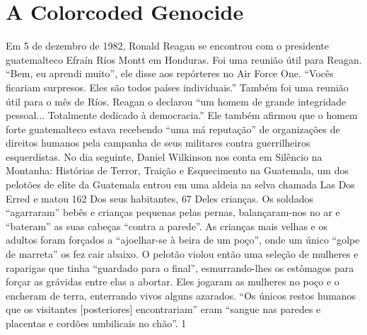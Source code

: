  
 \chapter{A Colorcoded Genocide}  

 \label{A Colorcoded Genocide}  
 
 
\par
 
 
 \textit{	}  

 
\par
 
 
 
\par
 

 \textbf{\textit{	} }  

 
\par
 
Em 5 de dezembro de 1982, Ronald Reagan se encontrou com o presidente guatemalteco Efraín Ríos Montt em Honduras. Foi uma reunião útil para Reagan. “Bem, eu aprendi muito”, ele disse aos repórteres no Air Force One. “Vocês ficariam surpresos. Eles são todos países individuais.” Também foi uma reunião útil para o mês de Ríos. Reagan o declarou “um homem de grande integridade pessoal... Totalmente dedicado à democracia.” Ele também afirmou que o homem forte guatemalteco estava recebendo “uma má reputação” de organizações de direitos humanos pela campanha de seus militares contra guerrilheiros esquerdistas. No dia seguinte, Daniel Wilkinson nos conta em Silêncio na Montanha: Histórias de Terror, Traição e Esquecimento na Guatemala, um dos pelotões de elite da Guatemala entrou em uma aldeia na selva chamada Las Dos Erred e matou
 {\color{blue} 162}  
Dos seus habitantes,
 {\color{blue} 67}  
Deles crianças. Os soldados “agarraram” bebês e crianças pequenas pelas pernas, balançaram-nos no ar e “bateram” as suas cabeças “contra a parede”. As crianças mais velhas e os adultos foram forçados a “ajoelhar-se à beira de um poço”, onde um único “golpe de marreta” os fez cair abaixo. O pelotão violou então uma seleção de mulheres e raparigas que tinha “guardado para o final”, esmurrando-lhes os estômagos para forçar as grávidas entre elas a abortar. Eles jogaram as mulheres no poço e o encheram de terra, enterrando vivos alguns azarados. “Os únicos restos humanos que os visitantes [posteriores] encontrariam” eram “sangue nas paredes e placentas e cordões umbilicais no chão”.
 {\color{blue} 1}  

 
\par
 

